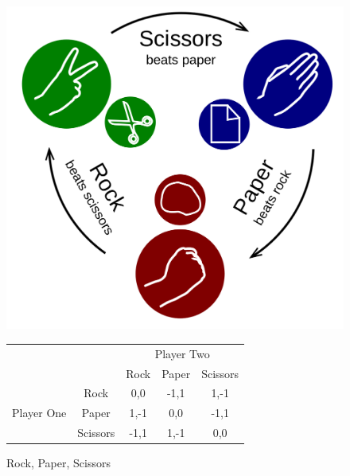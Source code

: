 \documentclass[a4paper, 11pt]{article}
\begin{document}
\begin{figure}[H]
  \begin{minipage}[b]{0.40\linewidth}
\includegraphics[width=1\linewidth]{Rock-paper-scissors}
  \end{minipage}%
  \begin{minipage}[b]{0.60\linewidth}
    \centering%
\begin{tabular}{cc|c|c|c|}
\cline{3-5}
                                                  &          & \multicolumn{3}{c|}{Player Two} \\ \cline{3-5} 
                                                  &          & Rock    & Paper    & Scissors   \\ \hline
\multicolumn{1}{|c|}{\multirow{3}{*}{Player One}} & Rock     & 0,0     & -1,1     & 1,-1       \\ \cline{2-5} 
\multicolumn{1}{|c|}{}                            & Paper    & 1,-1    & 0,0      & -1,1       \\ \cline{2-5} 
\multicolumn{1}{|c|}{}                            & Scissors & -1,1    & 1,-1     & 0,0        \\ \hline
\end{tabular}
    \par\vspace{0pt}
  \end{minipage}
\caption{Rock, Paper, Scissors}
\end{figure}
\end{document}
